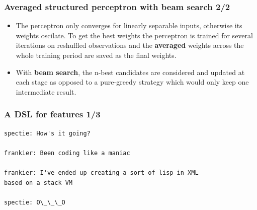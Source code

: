 \documentclass{beamer}
\begin{document}
\begin{frame}
\frametitle{Averaged structured perceptron with beam search 2/2}
\begin{itemize}

  \item The perceptron only converges for linearly separable inputs, otherwise
    its weights oscilate. To get the best weights the perceptron is trained for
    several iterations on reshuffled observations and the \textbf{averaged}
    weights across the whole training period are saved as the final weights.

  \item With \textbf{beam search}, the n-best candidates are considered and
    updated at each stage as opposed to a pure-greedy strategy which would only
    keep one intermediate result.

\end{itemize}
\end{frame}

{
\begin{frame}[plain]\end{frame}
}

\begin{frame}[fragile]
\frametitle{A DSL for features 1/3}

\begin{verbatim}
spectie: How's it going?

frankier: Been coding like a maniac

frankier: I've ended up creating a sort of lisp in XML
based on a stack VM

spectie: O\_\_\_O
\end{verbatim}

\end{frame}
\end{document}
